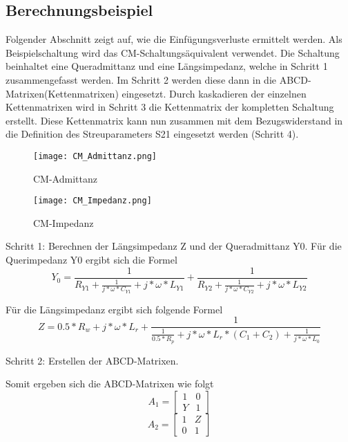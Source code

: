 \newpage

\subsection{Berechnungsbeispiel} \label{subsec:beispiel}
Folgender Abschnitt zeigt auf, wie die Einfügungsverluste ermittelt werden. Als Beispielschaltung wird das CM-Schaltungsäquivalent verwendet. Die Schaltung beinhaltet eine Queradmittanz und eine Längsimpedanz, welche in Schritt 1 zusammengefasst werden. Im Schritt 2 werden diese dann in die ABCD-Matrixen(Kettenmatrixen) eingesetzt. Durch kaskadieren der einzelnen Kettenmatrixen wird in Schritt 3 die Kettenmatrix der kompletten Schaltung erstellt. Diese Kettenmatrix kann nun zusammen mit dem Bezugswiderstand in die Definition des Streuparameters S21 eingesetzt werden (Schritt 4).

\begin{figure}[H]
	\centering
	\begin{minipage}[h]{0.45\linewidth}
		\texttt{[image: CM\_Admittanz.png]}
		\label{fig:CM-Admittanz}
		\caption{CM-Admittanz}
	\end{minipage}
	\hfill
	\begin{minipage}[h]{0.45\linewidth}
		\texttt{[image: CM\_Impedanz.png]}
		\caption{CM-Impedanz}
		\label{fig:CM-Impedanz}
	\end{minipage}
\end{figure}

Schritt 1: Berechnen der Längsimpedanz Z und der Queradmittanz Y0.
Für die Querimpedanz Y0 ergibt sich die Formel
\begin{equation}\label{y_admittance}
Y_0 = \frac{ 1 }{R_{Y1} + \frac{1}{j*\omega*C_{Y1}}+j*\omega*L_{Y1}} +\frac{ 1 }{R_{Y2} + \frac{1}{j*\omega*C_{Y2}}+j*\omega*L_{Y2}}
\end{equation}

Für die Längsimpedanz ergibt sich folgende Formel
\begin{equation}\label{z_impedance}
Z = 0.5*R_w+j*\omega*L_r+\frac{ 1 }{ \frac{1}{0.5*R_p}+j*\omega*L_r*(C_1+C_2)+\frac{1}{j*\omega*L_0} }
\end{equation}


Schritt 2: Erstellen der ABCD-Matrixen.

Somit ergeben sich die ABCD-Matrixen wie folgt
\begin{equation}\label{equ:abcd_a1}
A_1 =
\left[\begin{matrix}
1 & 0\\ Y&1 
\end{matrix}\right]
\end{equation}
\begin{equation}\label{equ:abcd_a2}
A_2 =
\left[\begin{matrix}
1 & Z\\ 0&1 
\end{matrix}\right]
\end{equation}

